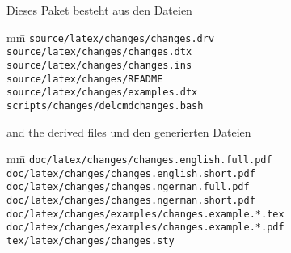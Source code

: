 	Dieses Paket besteht aus den Dateien
\fi

\begin{tabbing}
mm\=\kill
\>\texttt{source/latex/changes/changes.drv}\\
\>\texttt{source/latex/changes/changes.dtx}\\
\>\texttt{source/latex/changes/changes.ins}\\
\>\texttt{source/latex/changes/README}\\
\>\texttt{source/latex/changes/examples.dtx}\\

\>\texttt{scripts/changes/delcmdchanges.bash}
\end{tabbing}

\ifENGLISH
and the derived files
\fi
\ifGERMAN
	und den generierten Dateien
\fi

\begin{tabbing}
mm\=\kill
\>\texttt{doc/latex/changes/changes.english.full.pdf}\\
\>\texttt{doc/latex/changes/changes.english.short.pdf}\\
\>\texttt{doc/latex/changes/changes.ngerman.full.pdf}\\
\>\texttt{doc/latex/changes/changes.ngerman.short.pdf}\\

\>\texttt{doc/latex/changes/examples/changes.example.*.tex}\\
\>\texttt{doc/latex/changes/examples/changes.example.*.pdf}\\

\>\texttt{tex/latex/changes/changes.sty}
\end{tabbing}


